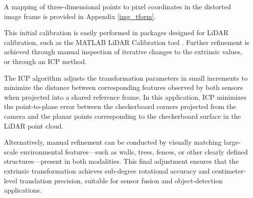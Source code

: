 \documentclass{erauthesis}
\begin{document}
A mapping of three-dimensional points to pixel coordinates in the distorted image frame is provided in Appendix \ref{img_tform}.

This initial calibration is easily performed in packages designed for LiDAR calibration, such as the MATLAB LiDAR Calibration tool \cite{matlab_calibration}.
Further refinement is achieved through manual inspection of iterative changes to the extrinsic values, or through an \ac{ICP} method.

The \ac{ICP} algorithm adjusts the transformation parameters in small increments to minimize the distance between corresponding features observed by both sensors when projected into a shared reference frame.
In this application, ICP minimizes the point-to-plane error between the checkerboard corners projected from the camera and the planar points corresponding to the checkerboard surface in the LiDAR point cloud.

Alternatively, manual refinement can be conducted by visually matching large-scale environmental features—such as walls, trees, fences, or other clearly defined structures—present in both modalities.  
This final adjustment ensures that the extrinsic transformation achieves sub-degree rotational accuracy and centimeter-level translation precision, suitable for sensor fusion and object-detection applications.


\end{document}
